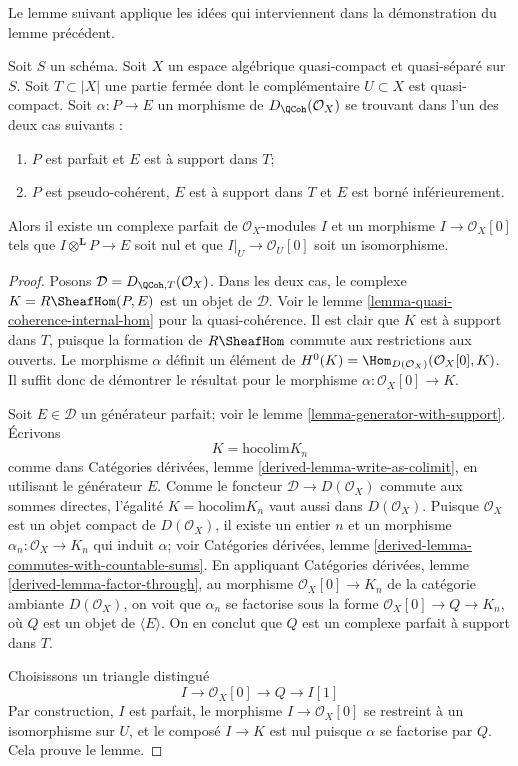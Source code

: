 \noindent
Le lemme suivant applique les id\'ees qui interviennent dans
la d\'emonstration du lemme pr\'ec\'edent.

\begin{lemma}
\label{lemma-map-from-pseudo-coherent-to-complex-with-support}
Soit $S$ un sch\'ema. Soit $X$ un espace alg\'ebrique quasi-compact et
quasi-s\'epar\'e sur $S$. Soit $T \subset |X|$
une partie ferm\'ee dont le compl\'ementaire $U \subset X$ est quasi-compact.
Soit $\alpha : P \to E$ un morphisme de $D_\QCoh(\mathcal{O}_X)$ se trouvant
dans l'un des deux cas suivants :
\begin{enumerate}
\item $P$ est parfait et $E$ est \`a support dans $T$;
\item $P$ est pseudo-coh\'erent, $E$ est \`a support dans $T$ et $E$ est
born\'e inf\'erieurement.
\end{enumerate}
Alors il existe un complexe parfait de $\mathcal{O}_X$-modules $I$
et un morphisme $I \to \mathcal{O}_X[0]$ tels que
$I \otimes^\mathbf{L} P \to E$ soit nul et que
$I|_U \to \mathcal{O}_U[0]$ soit un
isomorphisme.
\end{lemma}

\begin{proof}
Posons $\mathcal{D} = D_{\QCoh, T}(\mathcal{O}_X)$. Dans les deux cas, le complexe
$K = R\SheafHom(P, E)$ est un objet de $\mathcal{D}$. Voir le
lemme \ref{lemma-quasi-coherence-internal-hom} pour la quasi-coh\'erence.
Il est clair que $K$ est \`a support dans $T$, puisque la formation de
$R\SheafHom$ commute aux restrictions aux ouverts.
Le morphisme $\alpha$ d\'efinit un \'el\'ement de
$H^0(K) = \Hom_{D(\mathcal{O}_X)}(\mathcal{O}_X[0], K)$.
Il suffit donc de d\'emontrer le r\'esultat pour le morphisme
$\alpha : \mathcal{O}_X[0] \to K$.

\medskip\noindent
Soit $E \in \mathcal{D}$ un g\'en\'erateur parfait; voir le
lemme \ref{lemma-generator-with-support}. \'Ecrivons
$$
K = \text{hocolim} K_n
$$
comme dans Cat\'egories d\'eriv\'ees, lemme
\ref{derived-lemma-write-as-colimit}, en utilisant le g\'en\'erateur $E$.
Comme le foncteur $\mathcal{D} \to D(\mathcal{O}_X)$ commute aux sommes
directes, l'\'egalit\'e $K = \text{hocolim} K_n$ vaut aussi dans
$D(\mathcal{O}_X)$. Puisque $\mathcal{O}_X$ est un objet compact de
$D(\mathcal{O}_X)$, il existe un entier $n$ et un morphisme
$\alpha_n : \mathcal{O}_X \to K_n$ qui induit $\alpha$; voir
Cat\'egories d\'eriv\'ees, lemme
\ref{derived-lemma-commutes-with-countable-sums}.
En appliquant Cat\'egories d\'eriv\'ees, lemme
\ref{derived-lemma-factor-through}, au morphisme
$\mathcal{O}_X[0] \to K_n$ de la cat\'egorie ambiante
$D(\mathcal{O}_X)$, on voit que $\alpha_n$ se factorise sous la forme
$\mathcal{O}_X[0] \to Q \to K_n$, o\`u $Q$ est un objet
de $\langle E \rangle$. On en conclut que $Q$ est un complexe parfait
\`a support dans $T$.

\medskip\noindent
Choisissons un triangle distingu\'e
$$
I \to \mathcal{O}_X[0] \to Q \to I[1]
$$
Par construction, $I$ est parfait, le morphisme $I \to \mathcal{O}_X[0]$
se restreint \`a un isomorphisme sur $U$, et le compos\'e
$I \to K$ est nul puisque $\alpha$ se factorise par $Q$.
Cela prouve le lemme.
\end{proof}

